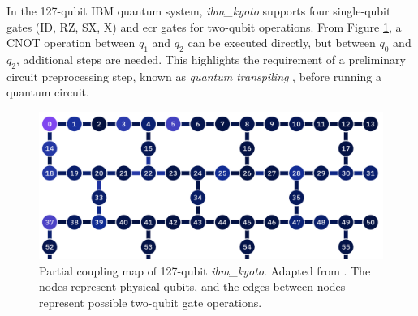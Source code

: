 In the 127-qubit IBM quantum system, \textit{ibm\_kyoto} supports four single-qubit gates (ID, RZ, SX, X) and \acrshort{ecr} gates for two-qubit operations. From Figure \ref{fig:ibm-kyoto}, a CNOT operation between $q_1$ and $q_2$ can be executed directly, but between $q_0$ and $q_2$, additional steps are needed. This highlights the requirement of a preliminary circuit preprocessing step, known as \textit{quantum transpiling} \cite{ferrari_compiler_2021}, before running a quantum circuit.
\begin{figure}
    \centering
    \includegraphics[width=0.6\linewidth]{image/ibm_kyoto.png}
    \caption{Partial coupling map of 127-qubit \textit{ibm\_kyoto}. Adapted from \citeauthor{ibmquantum_computeresources} \protect\cite{ibmquantum_computeresources}. The nodes represent physical qubits, and the edges between nodes represent possible two-qubit gate operations.}
    \label{fig:ibm-kyoto}
\end{figure}


